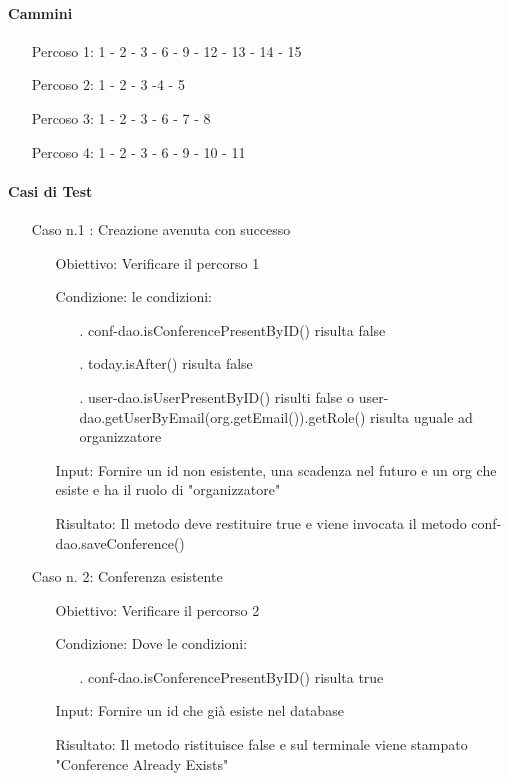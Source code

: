 \paragraph{Cammini}
\begin{itemize}
\item[Percoso 1: ] 1 - 2 - 3 - 6 - 9 - 12 - 13 - 14 - 15 
\item[Percoso 2: ] 1 - 2 - 3 -4 - 5
\item[Percoso 3: ] 1 - 2 - 3 - 6 - 7 - 8
\item[Percoso 4: ] 1 - 2 - 3 - 6 - 9 - 10 - 11
\end{itemize}
\paragraph{Casi di Test}
\begin{itemize}
\item[Caso n.1 :] Creazione avenuta con successo
\begin{itemize}
\item[Obiettivo:] Verificare il percorso 1
\item[Condizione:] le condizioni:
\begin{itemize}
\item[.] conf-dao.isConferencePresentByID() risulta false
\item[.] today.isAfter() risulta false
\item[.] user-dao.isUserPresentByID() risulti false o user-dao.getUserByEmail(org.getEmail()).getRole() risulta uguale ad organizzatore
\end{itemize}
\item[Input:] Fornire un id non esistente, una scadenza nel futuro e un org che esiste e ha il ruolo di "organizzatore"
\item[Risultato:] Il metodo deve restituire true e viene invocata il metodo conf-dao.saveConference()
\end{itemize}
\item[Caso n. 2:] Conferenza esistente
\begin{itemize}
\item[Obiettivo:]  Verificare il percorso 2
\item[Condizione:]  Dove le condizioni:
\begin{itemize}
\item[.] conf-dao.isConferencePresentByID() risulta true
\end{itemize}
\item[Input:] Fornire un id che già esiste nel database
\item[Risultato:] Il metodo ristituisce false e sul terminale viene stampato "Conference Already Exists"

\end{itemize}
\end{itemize}
